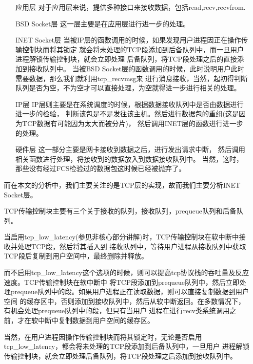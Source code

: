 \begin{enumerate}
\item[应用层]               对于应用层来说，提供多种接口来接收数据，包括read,recv,recvfrom.
\item[BSD Socket层]         这一层主要是在应用层进行进一步的处理。
\item[INET Socket层]            当被IP层的函数调用的时候，如果发现用户进程因正在操作传输控制块而将其锁定
                        就会将未处理的TCP段添加到后备队列中，而一旦用户进程解锁传输控制块，就会立即处理
                        后备队列，将TCP段处理之后的直接添加到接收队列中。
                        当被BSD Socket层的函数调用的时候，此时说明用户此时需要数据，那么我们就利用tcp\_recvmsg来
                        进行消息接收，当然，起初得判断队列是否为空，不为空才可以直接处理，为空就得进一步进行相关的处理。
\item[IP层]                 IP层则主要是在系统调度的时候，根据数据接收队列中是否由数据进行进一步的检验，
                        判断该包是不是发往该主机。然后进行数据包的重组(这是因为TCP数据有可能因为太大而被分片)，
                        然后调用INET层的函数进行进一步的处理。
\item[硬件层]               这一部分主要是网卡接收到数据之后，进行发出请求中断，
                        然后调用相关函数进行处理，将接收到的数据放入到数据接收队列中。
                        当然，这时，那些没有经过FCS检验过的数据包这时候已经被抛弃了。
\end{enumerate}

        而在本文的分析中，我们主要关注的是TCP层的实现，故而我们主要分析INET Socket层。

        TCP传输控制块主要有三个关于接收的队列，接收队列，prequeue队列和后备队列。

        当启用tcp\_low\_latency(参见非核心部分讲解)时，TCP传输控制块在软中断中接收并处理TCP段，然后将其插入到
        接收队列中，等待用户进程从接收队列中获取TCP段后复制到用户空间中，最终删除并释放。

        而不启用tcp\_low\_latency这个选项的时候，则可以提高tcp协议栈的吞吐量及反应速度。TCP传输控制块在软中断中
        将TCP段添加到prequeue队列中，然后立即处理prequeue队列中的段。如果用户进程正在读取数据，则可以直接复制数据到用户空间
        的缓存区中，否则添加到接收队列中，然后从软中断返回。在多数情况下，有机会处理prequeue队列中的段，但只有当用户
        进程在进行recv类系统调用之前，才在软中断中复制数据到用户空间的缓存区。

        当然，在用户进程因操作传输控制块而将其锁定时，无论是否启用tcp\_low\_latency，都会将未处理的TCP段添加到后备队列中，一旦用户
        进程解锁传输控制块，就会立即处理后备队列，将TCP段处理之后添加到接收队列中。

